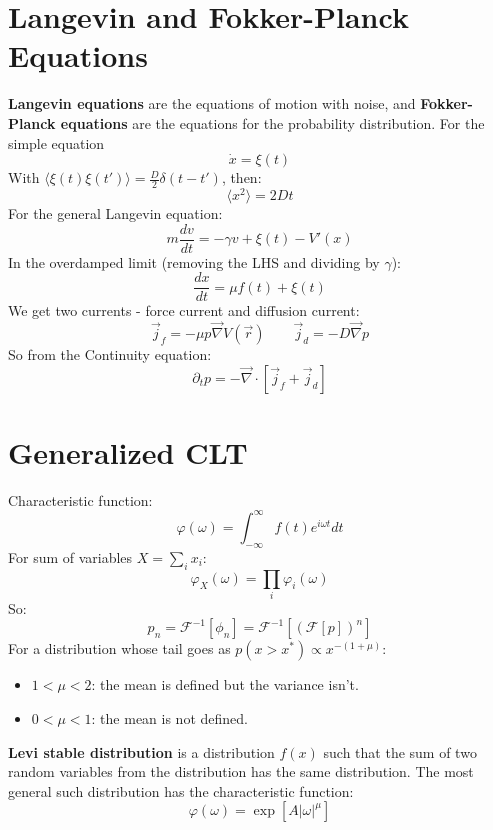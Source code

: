 \documentclass[twocolumn]{article}
\begin{document}
\section{Langevin and Fokker-Planck Equations}
\textbf{Langevin equations} are the equations of motion with noise, and \textbf{Fokker-Planck equations} are the equations for the probability distribution.
\newline
For the simple equation
\begin{equation}
    \dot{x} = \xi(t)
\end{equation}
With $\langle \xi(t)\xi(t') \rangle = \frac{D}{2}\delta(t - t')$, then:
\begin{equation}
    \langle x^2 \rangle = 2Dt
\end{equation}
For the general Langevin equation:
\begin{equation}
    m\frac{dv}{dt} = -\gamma v + \xi(t) - V'(x)
\end{equation}
In the overdamped limit (removing the LHS and dividing by $\gamma$):
\begin{equation}
    \frac{dx}{dt} = \mu f(t) + \xi(t)
\end{equation}
We get two currents - force current and diffusion current:
\begin{equation}
    \vec{j}_f = -\mu p \vec{\nabla}V(\vec{r})
    \qquad
    \vec{j}_d = -D \vec{\nabla}p
\end{equation}
So from the Continuity equation:
\begin{equation}
    \partial_t p = -\vec{\nabla}\cdot\left[\vec{j}_f + \vec{j}_d\right]
\end{equation}
\section{Generalized CLT}
Characteristic function:
\begin{equation}
    \varphi(\omega) = \int_{-\infty}^\infty f(t)e^{i\omega t}dt
\end{equation}
For sum of variables $X = \sum_i x_i$:
\begin{equation}
    \varphi_X(\omega) = \prod_i \varphi_i(\omega)
\end{equation}
So:
\begin{equation}
    p_n = \mathcal{F}^{-1}\left[\phi_n\right] = \mathcal{F}^{-1}\left[\left(\mathcal{F}\left[p\right]\right)^n\right]
\end{equation}
For a distribution whose tail goes as $p(x > x^*) \propto x^{-(1 + \mu)}$:
\begin{itemize}
    \item $1 < \mu < 2$: the mean is defined but the variance isn't.
    \item $0 < \mu < 1$: the mean is not defined.
\end{itemize}
\textbf{Levi stable distribution} is a distribution $f(x)$ such that the sum of two random variables from the distribution has the same distribution. The most general such distribution has the characteristic function:
\begin{equation}
    \varphi(\omega) = \exp[A\left|\omega\right|^\mu]
\end{equation}
\end{document}
